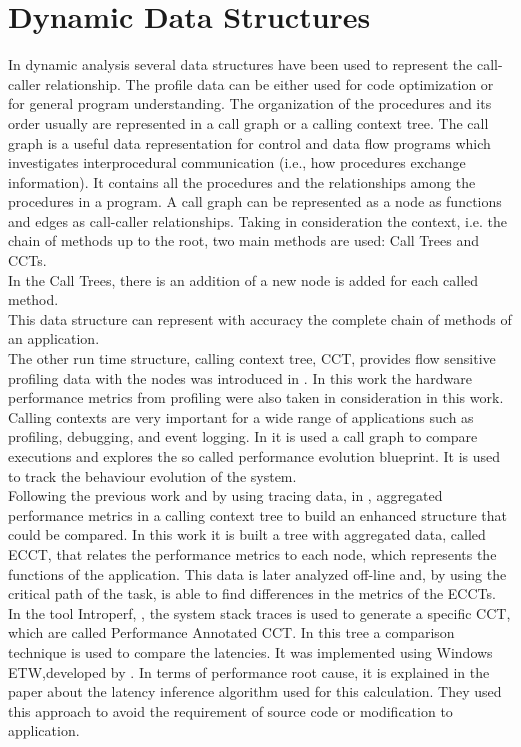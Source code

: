 \section{Dynamic Data Structures}
In dynamic analysis several data structures have been used to represent the call-caller relationship. The profile data can be either used for code optimization or for general program understanding. The organization of the procedures and its order usually are represented in a call graph or a calling context tree.
The call graph is a useful data representation for control and data flow programs which investigates interprocedural communication (i.e., how procedures exchange information). It contains all the procedures and the relationships among the procedures in a program. A call graph can be represented as a node as functions and edges as call-caller relationships. 
Taking in consideration the context, i.e. the chain of methods up to the root, two main methods are used: Call Trees and CCTs.\\
In the Call Trees, there is an addition of a new node is added for each called method. \\
This data structure can represent with accuracy the complete chain of methods of an application. \\
The other run time structure, calling context tree, CCT, provides flow sensitive profiling data with the nodes was introduced in \cite{blueprint}. In this work the hardware performance metrics from profiling were also taken in consideration in this work. Calling contexts are very important for a wide range of applications such as profiling, debugging, and event logging.  In \cite{blueprint} it is used a call graph to compare executions and explores the so called  performance evolution blueprint.  It is used to track the behaviour evolution of the system.\\
Following the previous work and by using tracing data, in \cite{doray_article}, aggregated performance metrics in a calling context tree to build an enhanced structure that could be compared. In this work it is built a tree with aggregated data, called ECCT, that relates the performance metrics to each node, which represents the functions of the application. This data is later analyzed off-line and, by using the critical path of the task, is able to find differences in the metrics of the ECCTs.\\
In the tool Introperf, \cite{Introperf}, the system stack traces is used to generate a specific CCT, which are called Performance Annotated CCT. In this tree a comparison technique is used to compare the latencies. It was implemented using Windows ETW,developed by \cite{ETW}. In terms of performance root cause, it is explained in the paper about the latency inference algorithm used for this calculation. They used this approach to avoid the requirement of source code or modification to application.\\
